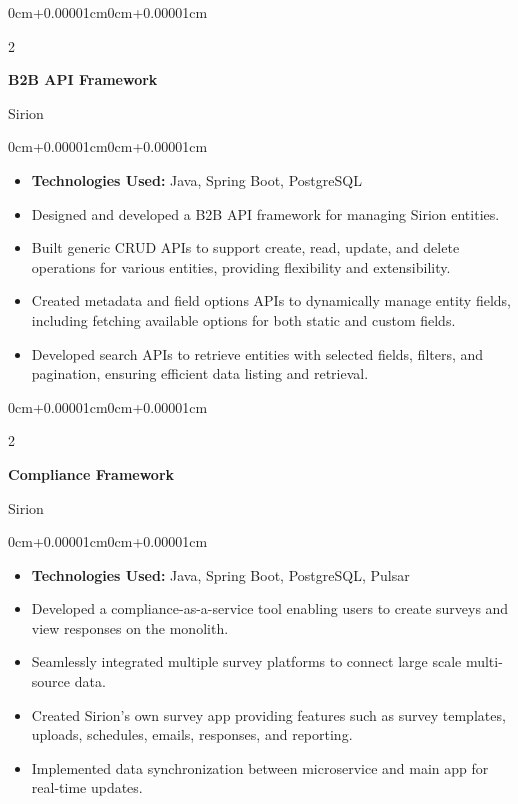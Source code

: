 \documentclass[10pt, letterpaper]{article}
\newenvironment{highlights}{
    \begin{itemize}[topsep=0.10cm,parsep=0.10cm,partopsep=0pt,itemsep=0pt,leftmargin=0cm+10pt]
}{
    \end{itemize}
}
\newenvironment{onecolentry}{
    \begin{adjustwidth}{0cm+0.00001cm}{0cm+0.00001cm}
}{
    \end{adjustwidth}
}
\newenvironment{twocolentry}[2][]{
    \onecolentry
    \def\secondColumn{#2}
    \setcolumnwidth{\fill, 4.5cm}
    \begin{paracol}{2}
}{
    \switchcolumn \raggedleft \secondColumn
    \end{paracol}
    \endonecolentry
}
\begin{document}
    \begin{twocolentry}{Sirion}
        \textbf{B2B API Framework}
    \end{twocolentry}
    \vspace{0.10cm}
    \begin{onecolentry}
        \begin{highlights}
            \item \textbf{Technologies Used:} Java, Spring Boot, PostgreSQL
            \item Designed and developed a B2B API framework for managing Sirion entities.
            \item Built generic CRUD APIs to support create, read, update, and delete operations for various entities, providing flexibility and extensibility.
            \item Created metadata and field options APIs to dynamically manage entity fields, including fetching available options for both static and custom fields.
            \item Developed search APIs to retrieve entities with selected fields, filters, and pagination, ensuring efficient data listing and retrieval.
        \end{highlights}
    \end{onecolentry}

    \vspace{0.15cm}

    \begin{twocolentry}{Sirion}
        \textbf{Compliance Framework}
    \end{twocolentry}
    \vspace{0.10cm}
    \begin{onecolentry}
        \begin{highlights}
            \item \textbf{Technologies Used:} Java, Spring Boot, PostgreSQL, Pulsar
            \item Developed a compliance-as-a-service tool enabling users to create surveys and view responses on the monolith.
            \item Seamlessly integrated multiple survey platforms to connect large scale multi-source data.
            \item Created Sirion's own survey app providing features such as survey templates, uploads, schedules, emails, responses, and reporting.
            \item Implemented data synchronization between microservice and main app for real-time updates.
        \end{highlights}
    \end{onecolentry}

\end{document}
